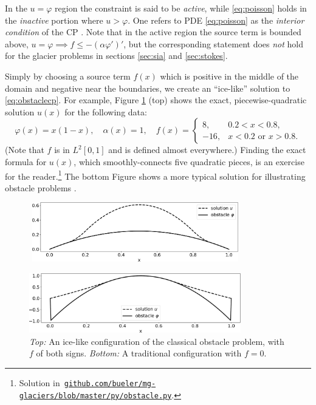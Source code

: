 \documentclass[letterpaper,final,12pt,reqno]{amsart}
\theoremstyle{claim}
\numberwithin{equation}{section}
\numberwithin{figure}{section}
\numberwithin{table}{section}
\numberwithin{theorem}{section}
\begin{document}
In the $u=\varphi$ region the constraint is said to be \emph{active}, while \eqref{eq:poisson} holds in the \emph{inactive} portion where $u>\varphi$.  One refers to PDE \eqref{eq:poisson} as the \emph{interior condition} of the CP \cite{KinderlehrerStampacchia1980}.  Note that in the active region the source term is bounded above, $u=\varphi \implies f \le -(\alpha\varphi')'$, but the corresponding statement does \emph{not} hold for the glacier problems in sections \ref{sec:sia} and \ref{sec:stokes}.

Simply by choosing a source term $f(x)$ which is positive in the middle of the domain and negative near the boundaries, we create an ``ice-like'' solution to \eqref{eq:obstaclecp}.  For example, Figure \ref{fig:icelike} (top) shows the exact, piecewise-quadratic solution $u(x)$ for the following data:
\begin{equation}
\varphi(x) = x(1-x), \quad \alpha(x)=1, \quad f(x) = \begin{cases} 8, & 0.2 < x < 0.8, \\
                                                                 -16, & x<0.2 \text{ or } x>0.8. \end{cases}  \label{eq:icelikedetails}
\end{equation}
(Note that $f$ is in $L^2[0,1]$ and is defined almost everywhere.)  Finding the exact formula for $u(x)$, which smoothly-connects five quadratic pieces, is an exercise for the reader.\footnote{Solution in\, \href{https://github.com/bueler/mg-glaciers/blob/master/py/obstacle.py}{\texttt{github.com/bueler/mg-glaciers/blob/master/py/obstacle.py}}.}  The bottom Figure shows a more typical solution for illustrating obstacle problems \cite[for example]{Bueler2021,Tai2003}.

\begin{figure}
\,\,\includegraphics[width=0.8\textwidth]{fixfigs/icelike.pdf}

\bigskip\medskip
\includegraphics[width=0.82\textwidth]{fixfigs/parabola.pdf}

\medskip
\caption{\emph{Top:} An ice-like configuration of the classical obstacle problem, with $f$ of both signs. \emph{Bottom:} A traditional configuration with $f=0$.}
\label{fig:icelike}
\end{figure}
\end{document}
